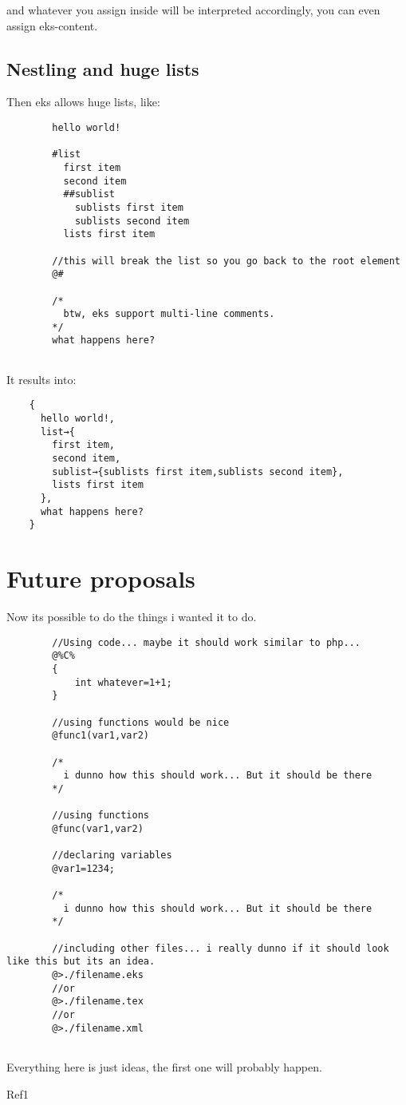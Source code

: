 \documentclass{book}
\begin{document}
	and whatever you assign inside will be interpreted accordingly, you can even assign eks-content.
	
	\section{Nestling and huge lists}
	
	Then eks allows huge lists, like:
	
	\begin{verbatim}
		hello world!
		
		#list
		  first item
		  second item
		  ##sublist
		    sublists first item
		    sublists second item
		  lists first item
		  
		//this will break the list so you go back to the root element
		@#
		
		/*
		  btw, eks support multi-line comments.
		*/
		what happens here?
		
	\end{verbatim}
	
	It results into:
	
	\begin{verbatim}
	{
	  hello world!,
	  list→{
	    first item,
	    second item,
	    sublist→{sublists first item,sublists second item},
	    lists first item
	  },
	  what happens here?
	}
	\end{verbatim}
	
	\chapter{Future proposals}
	
	Now its possible to do the things i wanted it to do.
	
	\begin{verbatim}
		//Using code... maybe it should work similar to php...
		@%C%
		{
			int whatever=1+1;
		}
		
		//using functions would be nice
		@func1(var1,var2)
		
		/*
		  i dunno how this should work... But it should be there
		*/
		
		//using functions
		@func(var1,var2)
		
		//declaring variables
		@var1=1234;
		
		/*
		  i dunno how this should work... But it should be there
		*/
		
		//including other files... i really dunno if it should look like this but its an idea.
		@>./filename.eks
		//or
		@>./filename.tex
		//or
		@>./filename.xml		
		
	\end{verbatim}
	
	Everything here is just ideas, the first one will probably happen.
	
	\begin{thebibliography}{1}

		Ref1
	
	\end{thebibliography}
	
\end{document}
